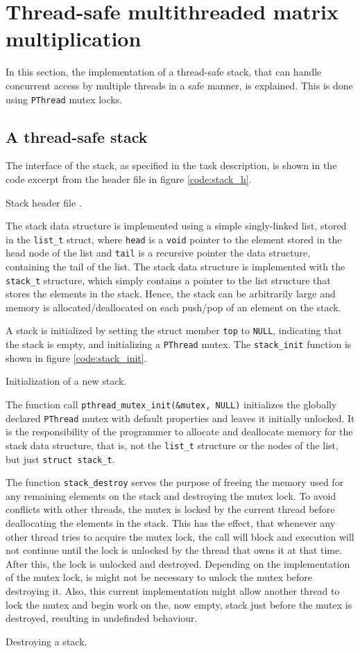 %
%
%
\section{Thread-safe multithreaded matrix multiplication}
In this section, the implementation of a thread-safe stack, that can handle
concurrent access by multiple threads in a safe manner, is explained. This is
done using \verb|PThread| mutex locks.

\subsection{A thread-safe stack}
The interface of the stack, as specified
in the task description, is shown in the code excerpt from the header file
 in figure \ref{code:stack_h}.

        {Stack header file .}

The stack data structure is implemented using a simple singly-linked list,
stored in the \verb|list_t| struct, where \verb|head| is a \verb|void| pointer
to the element stored in the head node of the list and \verb|tail| is a
recursive pointer the data structure, containing the tail of the list.
The stack data structure is implemented with the \verb|stack_t| structure, which
simply contains a pointer to the list structure that stores the elements in the
stack. Hence, the stack can be arbitrarily large and memory is
allocated/deallocated on each push/pop of an element on the stack.

A stack is initialized by setting the struct member \verb|top| to \verb|NULL|,
indicating that the stack is empty, and initializing a \verb|PThread| mutex.
The \verb|stack_init| function is shown in figure \ref{code:stack_init}.

        {Initialization of a new stack.}

The function call \verb|pthread_mutex_init(&mutex, NULL)| initializes the
globally declared \verb|PThread| mutex with default properties and leaves it
initially unlocked. It is the responsibility of the programmer to allocate
and deallocate memory for the stack data structure, that is, not the
\verb|list_t| structure or the nodes of the list, but just \verb|struct stack_t|.

The function \verb|stack_destroy| serves the purpose of freeing the memory used
for any remaining elements on the stack and destroying the mutex lock. To avoid
conflicts with other threads, the mutex is locked by the current thread before
deallocating the elements in the stack. This has the effect, that whenever any
other thread tries to acquire the mutex lock, the call will block and execution
will not continue until the lock is unlocked by the thread that owns it at that
time. After this, the lock is unlocked and destroyed. Depending on the
implementation of the mutex lock, is might not be necessary to unlock the mutex
before destroying it. Also, this current implementation might allow another
thread to lock the mutex and begin work on the, now empty, stack just before the
mutex is destroyed, resulting in undefinded behaviour.

        {Destroying a stack.}
